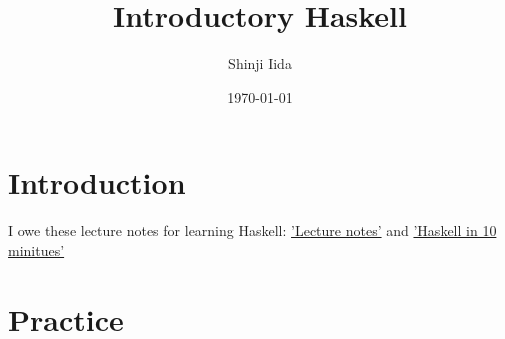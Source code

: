 \documentclass[11pt, oneside]{article}   	%
\title{Introductory Haskell}
\author{Shinji Iida}
\date{\today}							%
\begin{document}
\maketitle
\tableofcontents


\section{Introduction}
I owe these lecture notes for learning Haskell:
\href{http://www.cis.upenn.edu/~cis194/spring13/lectures.html}{'Lecture notes'}
and 
\href{https://wiki.haskell.org/Learn_Haskell_in_10_minutes#Simple_types}{'Haskell in 10 minitues'}



\section{Practice}




\end{document}
